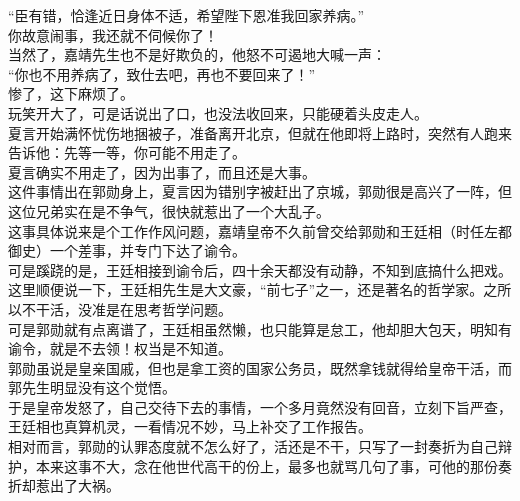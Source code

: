\begin{multicols}{\theparacolNo}
“臣有错，恰逢近日身体不适，希望陛下恩准我回家养病。”\\

你故意闹事，我还就不伺候你了！\\

当然了，嘉靖先生也不是好欺负的，他怒不可遏地大喊一声：\\

“你也不用养病了，致仕去吧，再也不要回来了！”\\

惨了，这下麻烦了。\\

玩笑开大了，可是话说出了口，也没法收回来，只能硬着头皮走人。\\

夏言开始满怀忧伤地捆被子，准备离开北京，但就在他即将上路时，突然有人跑来告诉他：先等一等，你可能不用走了。\\

夏言确实不用走了，因为出事了，而且还是大事。\\

这件事情出在郭勋身上，夏言因为错别字被赶出了京城，郭勋很是高兴了一阵，但这位兄弟实在是不争气，很快就惹出了一个大乱子。\\

这事具体说来是个工作作风问题，嘉靖皇帝不久前曾交给郭勋和王廷相（时任左都御史）一个差事，并专门下达了谕令。\\

可是蹊跷的是，王廷相接到谕令后，四十余天都没有动静，不知到底搞什么把戏。\\

这里顺便说一下，王廷相先生是大文豪，“前七子”之一，还是著名的哲学家。之所以不干活，没准是在思考哲学问题。\\

可是郭勋就有点离谱了，王廷相虽然懒，也只能算是怠工，他却胆大包天，明知有谕令，就是不去领！权当是不知道。\\

郭勋虽说是皇亲国戚，但也是拿工资的国家公务员，既然拿钱就得给皇帝干活，而郭先生明显没有这个觉悟。\\

于是皇帝发怒了，自己交待下去的事情，一个多月竟然没有回音，立刻下旨严查，王廷相也真算机灵，一看情况不妙，马上补交了工作报告。\\

相对而言，郭勋的认罪态度就不怎么好了，活还是不干，只写了一封奏折为自己辩护，本来这事不大，念在他世代高干的份上，最多也就骂几句了事，可他的那份奏折却惹出了大祸。\\


\end{multicols}
